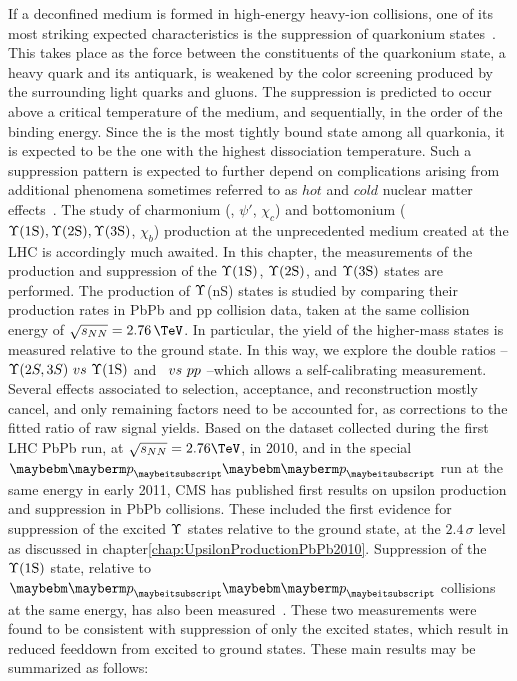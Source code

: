 If a deconfined medium is formed in high-energy heavy-ion collisions, one of its most striking expected characteristics is the 
suppression of quarkonium states~\cite{Matsui:1986dk}. 
This takes place as the force between the constituents of the quarkonium state, a heavy quark and its antiquark, is weakened by 
the color screening produced by the surrounding light quarks and gluons.
The suppression is predicted to occur above a critical temperature of the medium, and sequentially, in the
order of the \QQbar binding energy. 
Since the \PgUa is the most tightly bound state among all quarkonia, it is expected to be the one
with the highest dissociation temperature. %
Such a suppression pattern is expected to further depend on complications arising from additional phenomena sometimes referred to as
$hot$ and $cold$ nuclear matter effects~\cite{Brambilla:2010cs,Vogt:2010aa}. 
%
The study of charmonium (\Jpsi, $\psi'$, $\chi_c$) and bottomonium ($\Upsilon\text{(1S)}, \Upsilon\text{(2S)}, \Upsilon\text{(3S)}$, $\chi_b$) production at the unprecedented medium 
created at the LHC is accordingly much awaited.  
In this chapter, the measurements of the production and suppression of the $\Upsilon\text{(1S)}$,  $\Upsilon\text{(2S)}$, and  $\Upsilon\text{(3S)}$ states are performed. 
The production of $\Upsilon$(nS) states is studied by comparing their production rates in PbPb and pp collision data, taken at the same collision 
energy of $\sqrt{s_{NN}}=2.76\,\TeV$.
In particular, the yield of the higher-mass states is measured relative to the ground state. In this way, we explore the double ratios  
--  $\Upsilon(2S,3S)~vs~\Upsilon\text{(1S)}$ and \PbPb~$vs~{pp}$ --which allows a self-calibrating measurement.  
%
Several effects associated to selection, acceptance, and reconstruction mostly cancel, and only remaining factors need to be accounted for,  
as corrections to the fitted ratio of raw signal yields.  
Based on the dataset collected during the first LHC PbPb run, at $\sqrtsnn = 2.76\TeV$, in 2010, and in the special $\Pp\Pp$ run at the 
same energy in early 2011, CMS has published first results on upsilon production and suppression in PbPb collisions. 
%
These included the first evidence for suppression of the excited $\Upsilon$ states relative to the ground state, at the $2.4\,\sigma$ level as 
discussed in chapter\ref{chap:UpsilonProductionPbPb2010}.%
Suppression of the $\Upsilon\text{(1S)}$ state, relative to $\Pp\Pp$ collisions at the same energy, has also been measured~\cite{prl,QM2011}. 
These two measurements were found to be consistent with suppression of only the excited states, which result in reduced feeddown 
from excited to ground states. These main results may be summarized as follows:
